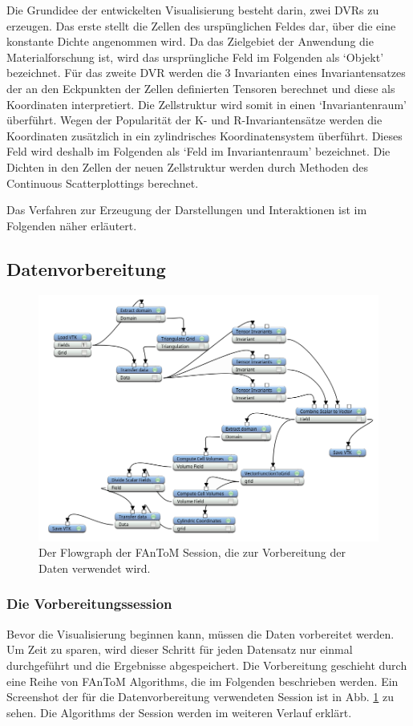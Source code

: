 \documentclass[a4paper,fontsize=12pt,toc=bib,halfparskip]{scrartcl}
\begin{document}
Die Grundidee der entwickelten Visualisierung besteht darin, zwei DVRs zu erzeugen. Das erste stellt die Zellen des ursp\"unglichen Feldes dar, \"uber die eine konstante Dichte angenommen wird. Da das Zielgebiet der Anwendung die Materialforschung ist, wird das urspr\"ungliche Feld im Folgenden als `Objekt' bezeichnet. F\"ur das zweite DVR werden die 3 Invarianten eines Invariantensatzes der an den Eckpunkten der Zellen definierten Tensoren berechnet und diese als Koordinaten interpretiert. Die Zellstruktur wird somit in einen `Invariantenraum' \"uberf\"uhrt. Wegen der Popularit\"at der K- und R-Invariantens\"atze werden die Koordinaten zus\"atzlich in ein zylindrisches Koordinatensystem \"uberf\"uhrt. Dieses Feld wird deshalb im Folgenden als `Feld im Invariantenraum' bezeichnet. Die Dichten in den Zellen der neuen Zellstruktur werden durch Methoden des Continuous Scatterplottings berechnet.

Das Verfahren zur Erzeugung der Darstellungen und Interaktionen ist im Folgenden n\"aher erl\"autert.

\subsection{Datenvorbereitung}
\begin{figure}
	\centering
	\includegraphics[width=\textwidth]{pictures/BigSession.png}
	\caption{Der Flowgraph der FAnToM Session, die zur Vorbereitung der Daten verwendet wird.}
	\label{BigSession}
\end{figure}
\subsubsection{Die Vorbereitungssession}
Bevor die Visualisierung beginnen kann, m\"ussen die Daten vorbereitet werden. Um Zeit zu sparen, wird dieser Schritt f\"ur jeden Datensatz nur einmal durchgef\"uhrt und die Ergebnisse abgespeichert. Die Vorbereitung geschieht durch eine Reihe von FAnToM Algorithms, die im Folgenden beschrieben werden. Ein Screenshot der f\"ur die Datenvorbereitung verwendeten Session ist in Abb. \ref{BigSession} zu sehen. Die Algorithms der Session werden im weiteren Verlauf erkl\"art.
\end{document}
